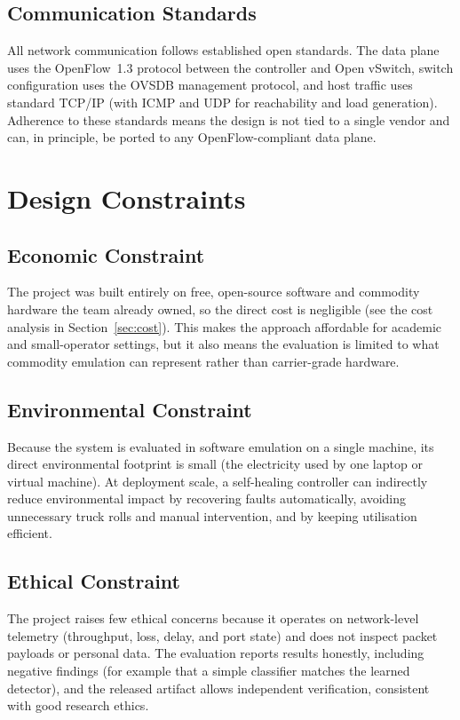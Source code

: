 \documentclass[12pt,a4paper]{report}
\begin{document}
\subsection{Communication Standards}
All network communication follows established open standards. The data plane uses the
OpenFlow~1.3 protocol between the controller and Open vSwitch, switch configuration uses the
OVSDB management protocol, and host traffic uses standard TCP/IP (with ICMP and UDP for
reachability and load generation). Adherence to these standards means the design is not tied
to a single vendor and can, in principle, be ported to any OpenFlow-compliant data plane.

\section{Design Constraints}
\subsection{Economic Constraint}
The project was built entirely on free, open-source software and commodity hardware the team
already owned, so the direct cost is negligible (see the cost analysis in
Section~\ref{sec:cost}). This makes the approach affordable for academic and small-operator
settings, but it also means the evaluation is limited to what commodity emulation can
represent rather than carrier-grade hardware.

\subsection{Environmental Constraint}
Because the system is evaluated in software emulation on a single machine, its direct
environmental footprint is small (the electricity used by one laptop or virtual machine). At
deployment scale, a self-healing controller can indirectly reduce environmental impact by
recovering faults automatically, avoiding unnecessary truck rolls and manual intervention,
and by keeping utilisation efficient.

\subsection{Ethical Constraint}
The project raises few ethical concerns because it operates on network-level telemetry
(throughput, loss, delay, and port state) and does not inspect packet payloads or personal
data. The evaluation reports results honestly, including negative findings (for example that
a simple classifier matches the learned detector), and the released artifact allows
independent verification, consistent with good research ethics.
\end{document}
